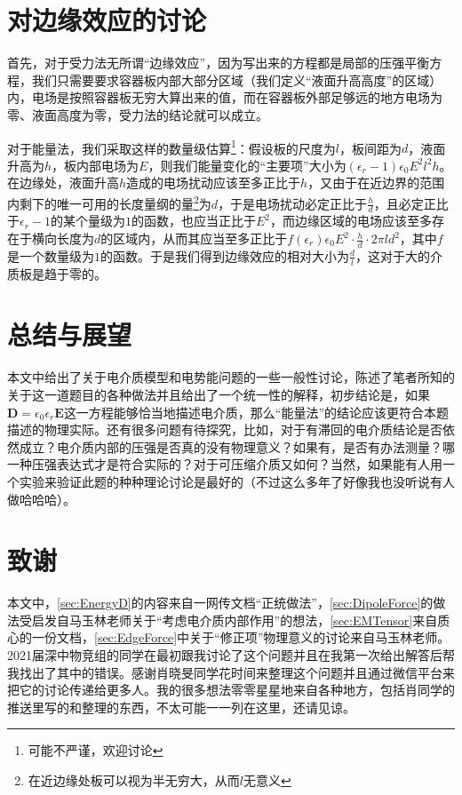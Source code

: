 \documentclass{ctexart}
\newcommand{\epsz}{\epsilon_0}
\newcommand{\epsr}{\epsilon_r}
\begin{document}
	\section{对边缘效应的讨论}\label{sec:Edge}
	
	首先，对于受力法无所谓“边缘效应”，因为写出来的方程都是局部的压强平衡方程，我们只需要要求容器板内部大部分区域（我们定义“液面升高高度”的区域）内，电场是按照容器板无穷大算出来的值，而在容器板外部足够远的地方电场为零、液面高度为零，受力法的结论就可以成立。
	
	对于能量法，我们采取这样的数量级估算\footnote{可能不严谨，欢迎讨论}：假设板的尺度为$l$，板间距为$d$，液面升高为$h$，板内部电场为$E$，则我们能量变化的“主要项”大小为$(\epsr-1)\epsz E^2 l^2 h$。在边缘处，液面升高$h$造成的电场扰动应该至多正比于$h$，又由于在近边界的范围内剩下的唯一可用的长度量纲的量\footnote{在近边缘处板可以视为半无穷大，从而$l$无意义}为$d$，于是电场扰动必定正比于$\frac{h}{d}$，且必定正比于$\epsr-1$的某个量级为$1$的函数，也应当正比于$E^2$，而边缘区域的电场应该至多存在于横向长度为$d$的区域内，从而其应当至多正比于$f(\epsr)\epsz E^2\cdot \frac{h}{d}\cdot 2\pi ld^2$，其中$f$是一个数量级为$1$的函数。于是我们得到边缘效应的相对大小为$\frac{d}{l}$，这对于大的介质板是趋于零的。
	
	\section{总结与展望}
	
	本文中给出了关于电介质模型和电势能问题的一些一般性讨论，陈述了笔者所知的关于这一道题目的各种做法并且给出了一个统一性的解释，初步结论是，如果$\mathbf D=\epsz\epsr\mathbf E$这一方程能够恰当地描述电介质，那么“能量法”的结论应该更符合本题描述的物理实际。还有很多问题有待探究，比如，对于有滞回的电介质结论是否依然成立？电介质内部的压强是否真的没有物理意义？如果有，是否有办法测量？哪一种压强表达式才是符合实际的？对于可压缩介质又如何？当然，如果能有人用一个实验来验证此题的种种理论讨论是最好的（不过这么多年了好像我也没听说有人做哈哈哈）。
		
	\section{致谢}
	
	本文中，\ref{sec:EnergyD}的内容来自一网传文档“正统做法”，\ref{sec:DipoleForce}的做法受启发自马玉林老师关于“考虑电介质内部作用”的想法，\ref{sec:EMTensor}来自质心的一份文档，\ref{sec:EdgeForce}中关于“修正项”物理意义的讨论来自马玉林老师。2021届深中物竞组的同学在最初跟我讨论了这个问题并且在我第一次给出解答后帮我找出了其中的错误。感谢肖晓旻同学花时间来整理这个问题并且通过微信平台来把它的讨论传递给更多人。我的很多想法零零星星地来自各种地方，包括肖同学的推送里写的和整理的东西，不太可能一一列在这里，还请见谅。
	
\end{document}
